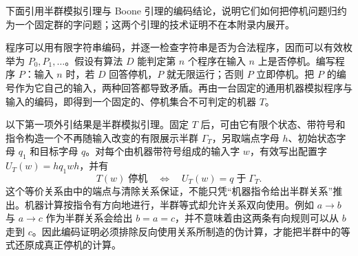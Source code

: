 \begin{proofsketch}
	下面引用半群模拟引理与 Boone 引理的编码结论，说明它们如何把停机问题归约为一个固定群的字问题；这两个引理的技术证明不在本附录内展开。

	程序可以用有限字符串编码，并逐一检查字符串是否为合法程序，因而可以有效枚举为 \(P_0,P_1,\ldots\)。假设有算法 \(D\) 能判定第 \(n\) 个程序在输入 \(n\) 上是否停机。编写程序 \(P\)：输入 \(n\) 时，若 \(D\) 回答停机，\(P\) 就无限运行；否则 \(P\) 立即停机。把 \(P\) 的编号作为它自己的输入，两种回答都导致矛盾。再由一台固定的通用机器模拟程序与输入的编码，即得到一个固定的、停机集合不可判定的机器 \(T\)\cite[Theorem 12.1, pp. 423--424]{Rotman1995TheoryGroups}。

	以下第一项外引结果是半群模拟引理。固定 \(T\) 后，可由它有限个状态、带符号和指令构造一个不再随输入改变的有限展示半群 \(\Gamma_T\)，另取端点字母 \(h\)、初始状态字母 \(q_1\) 和目标字母 \(q\)。对每个由机器带符号组成的输入字 \(w\)，有效写出配置字 \(U_T(w)=hq_1wh\)，并有
	\[
		T(w)\;\text{停机}\quad\Longleftrightarrow\quad U_T(w)=q\;\text{于}\;\Gamma_T.
	\]
	这个等价关系由\cite[Lemmas 12.3--12.4, pp. 427--428]{Rotman1995TheoryGroups}中的端点与清除关系保证，不能只凭“机器指令给出半群关系”推出。机器计算按指令有方向地进行，半群等式却允许关系双向使用。例如 \(a\to b\) 与 \(a\to c\) 作为半群关系会给出 \(b=a=c\)，并不意味着由这两条有向规则可以从 \(b\) 走到 \(c\)。因此编码证明必须排除反向使用关系所制造的伪计算，才能把半群中的等式还原成真正停机的计算。


\end{proofsketch}

